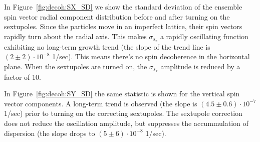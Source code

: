 In Figure~\ref{fig:decoh:SX_SD} we show the standard deviation of the ensemble spin vector
 radial component distribution before and after turning on the sextupoles.
Since the particles move in an imperfect lattice, their spin vectors rapidly turn about the radial axis.
This makes $\sigma_{s_x}$ a rapidly oscillating function exhibiting no long-term growth trend
(the slope of the trend line is $(2\pm2)\cdot 10^{-8}$ 1/sec). This means there's no spin decoherence
in the horizontal plane. When the sextupoles are turned on, the $\sigma_{s_x}$ amplitude is reduced by
a factor of 10.

In Figure~\ref{fig:decoh:SY_SD} the same statistic is shown for the vertical spin vector components.
A long-term trend is observed (the slope is $(4.5 \pm 0.6)\cdot 10^{-7}$ 1/sec) prior to turning on
the correcting sextupoles. The sextupole correction does not reduce the oscillation amplitude, 
but suppresses the accummulation of dispersion (the slope drops to $(5\pm 6)\cdot 10^{-8}$ 1/sec).

